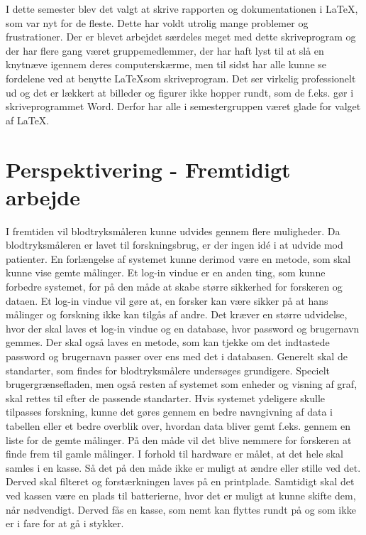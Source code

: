 I dette semester blev det valgt at skrive rapporten og dokumentationen i \LaTeX, som var nyt for de fleste. Dette har voldt utrolig mange problemer og frustrationer.  Der er blevet arbejdet særdeles meget med dette skriveprogram og der har flere gang været gruppemedlemmer, der har haft lyst til at slå en knytnæve igennem deres computerskærme, men til sidst har alle kunne se fordelene ved at benytte \LaTeX som skriveprogram. Det ser virkelig professionelt ud og det er lækkert at billeder og figurer ikke hopper rundt, som de f.eks. gør i skriveprogrammet Word. Derfor har alle i semestergruppen været glade for valget af \LaTeX. \\


\section{Perspektivering - Fremtidigt arbejde}
I fremtiden vil blodtryksmåleren kunne udvides gennem flere muligheder. Da blodtryksmåleren er lavet til forskningsbrug, er der ingen idé i at udvide mod patienter.  En forlængelse af systemet kunne derimod være en metode, som skal kunne vise gemte målinger. \newline Et log-in vindue er en anden ting, som kunne forbedre systemet, for på den måde at skabe større sikkerhed for forskeren og dataen. Et log-in vindue vil gøre at, en forsker kan være sikker på at hans målinger og forskning ikke kan tilgås af andre. Det kræver en større udvidelse, hvor der skal laves et log-in vindue og en database, hvor password og brugernavn gemmes. Der skal også laves en metode, som kan tjekke om det indtastede password og brugernavn passer over ens med det i databasen. 
\newline
Generelt skal de standarter, som findes for blodtryksmålere undersøges grundigere. Specielt brugergrænsefladen, men også resten af systemet som enheder og visning af graf, skal rettes til efter de passende standarter.
\newline 
Hvis systemet ydeligere skulle tilpasses forskning, kunne det gøres gennem en bedre navngivning af data i tabellen eller et bedre overblik over, hvordan data bliver gemt f.eks. gennem en liste for de gemte målinger. På den måde vil det blive nemmere for forskeren at finde frem til gamle målinger.   
\newline 
I forhold til hardware er målet, at det hele skal samles i en kasse. Så det på den måde ikke er muligt at ændre eller stille ved det. Derved skal filteret og forstærkningen laves på en printplade. Samtidigt skal det ved kassen være en plads til batterierne, hvor det er muligt at kunne skifte dem, når nødvendigt. Derved fås en kasse, som nemt kan flyttes rundt på og som ikke er i fare for at gå i stykker.   